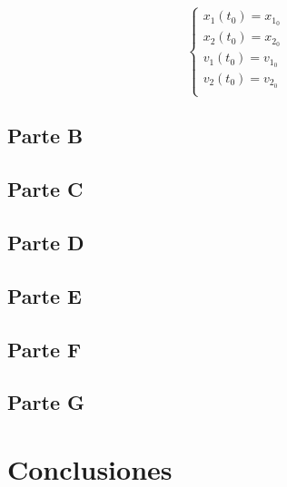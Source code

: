 \documentclass[titlepage,a4paper]{article}
\begin{document}
		\begin{equation}
			\begin{cases}
				x_{1}(t_{0}) = x_{1_{0}}\\
				x_{2}(t_{0}) = x_{2_{0}}\\
				v_{1}(t_{0}) = v_{1_{0}}\\
				v_{2}(t_{0}) = v_{2_{0}}\\
			\end{cases}
		\end{equation}

	\subsection{Parte B}\label{sec:parteB}
		


	\subsection{Parte C}\label{sec:parteC}
		

	\subsection{Parte D}\label{sec:parteD}

	\subsection{Parte E}\label{sec:parteE}

	\subsection{Parte F}\label{sec:parteF}

	\subsection{Parte G}\label{sec:parteG}

\section{Conclusiones}\label{sec:conc}


\begin{thebibliography}{9} 
	
	 
\end{thebibliography}
\end{document}
